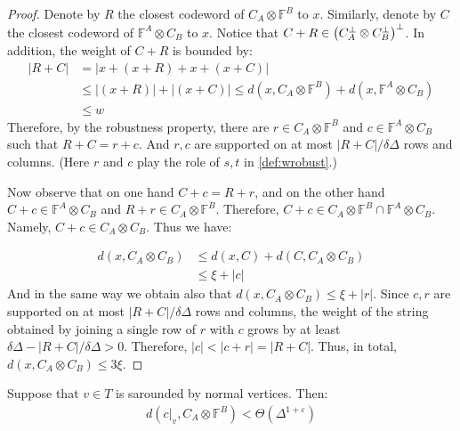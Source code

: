  \begin{proof}
Denote by $R$ the closest codeword of $C_{A}\otimes\mathbb{F}^{B}$ to $x$. Similarly, denote by $C$ the closest codeword of $\mathbb{F}^{A} \otimes C_{B}$ to $x$. Notice that $C + R \in \left( C_{A}^{\perp}\otimes C_{B}^{\perp} \right)^{\perp}$. In addition, the weight of $C+R$ is bounded by:
   \begin{equation*}
     \begin{split}
       |R + C| &=  |x + \left(x + R\right) + x + \left( x + C\right)| \\
       & \le |\left(x + R\right)|+ |\left( x + C\right)| \le d\left( x ,   C_{A}\otimes\mathbb{F}^{B} \right) +  d\left( x ,   \mathbb{F}^{A} \otimes C_{B} \right) \\ 
       & \le w
     \end{split}
   \end{equation*}
   Therefore, by the robustness property, there are $r \in C_{A}\otimes\mathbb{F}^{B}$ and $c \in \mathbb{F}^{A} \otimes C_{B} $ such that $ R + C  = r + c$. And $r,c$ are supported on at most $|R+C|/\delta\Delta$ rows and columns. (Here $r$ and $c$ play the role of $s,t$ in \cref{def:wrobust}.)  

   Now observe that on one hand $C + c = R + r$, and on the other hand $ C + c \in \mathbb{F}^{A} \otimes C_{B} $ and $R+r \in C_{A}\otimes\mathbb{F}^{B}$. Therefore, $C+c \in C_{A}\otimes\mathbb{F}^{B} \cap \mathbb{F}^{A} \otimes C_{B}$. Namely, $C +c \in C_{A} \otimes C_{B}$. Thus we have:  
   
   \begin{equation*}
     \begin{split}
       d\left(x, C_{A}\otimes C_{B}\right) & \le d\left(x, C\right) + d\left(C, C_{A}\otimes C_{B} \right) \\
       &\le \xi + |c|
     \end{split}
   \end{equation*}
   And in the same way we obtain also that $d\left( x, C_{A} \otimes C_{B} \right) \le \xi + |r|$. Since $c,r$ are supported on at most $|R+C|/\delta\Delta$ rows and columns, the weight of the string obtained by joining a single row of $r$ with $c$ grows by at least $\delta\Delta - |R+C|/\delta\Delta > 0$. Therefore, $|c| < |c + r| = |R + C|$. Thus, in total, $d\left( x, C_{A} \otimes C_{B} \right) \le 3\xi$.
 \end{proof}
\begin{claim}
  Suppose that $v \in T$ is sarounded by normal vertices. Then:
  \begin{equation*}
    \begin{split}
      d\left( c|_{v}, C_{A} \otimes \mathbb{F}^{B}\right) < \Theta\left( \Delta^{1+\varepsilon} \right)
    \end{split}
  \end{equation*} 
 \end{claim}
